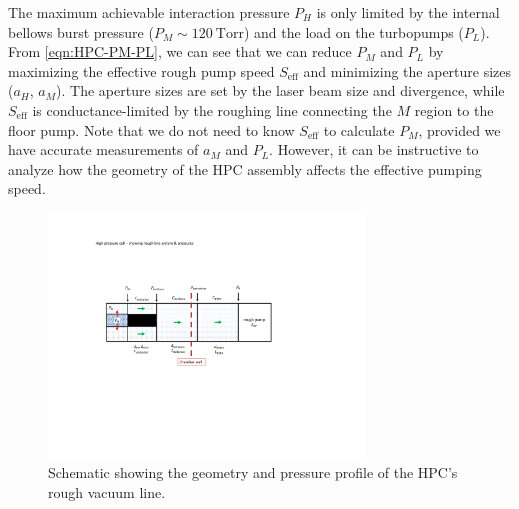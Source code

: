 The maximum achievable interaction pressure $P_H$ is only limited by the internal bellows burst pressure ($P_M \sim 120 \ \textrm{Torr}$) and the load on the turbopumps ($P_L$). From \cref{eqn:HPC-PM-PL}, we can see that we can reduce $P_M$ and $P_L$ by maximizing the effective rough pump speed $S_{\textrm{eff}}$ and minimizing the aperture sizes ($a_H$, $a_M$). The aperture sizes are set by the laser beam size and divergence, while $S_{\textrm{eff}}$ is conductance-limited by the roughing line connecting the $M$ region to the floor pump. Note that we do not need to know $S_{\textrm{eff}}$ to calculate $P_M$, provided we have accurate measurements of $a_M$ and $P_L$. However, it can be instructive to analyze how the geometry of the HPC assembly affects the effective pumping speed.


\begin{figure}
	\centering
	\includegraphics[width=0.75\textwidth]{figures/chap3/HPC_rough_line_schematic.pdf}
	\caption{Schematic showing the geometry and pressure profile of the HPC's rough vacuum line.}
	\label{fig:HPC_rough_line_schematic}
\end{figure}

